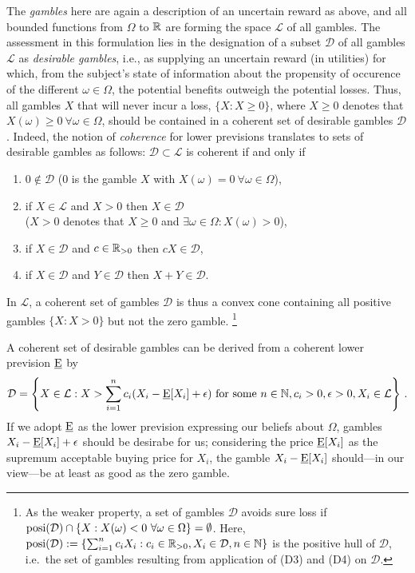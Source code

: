The \emph{gambles} here are again a description of an uncertain reward as above, 
and all bounded functions from $\Omega$ to $\mathbb{R}$
are forming the space $\mathcal{L}$ of all gambles.
The assessment in this formulation lies in the designation of a subset $\mathcal{D}$
of all gambles $\mathcal{L}$ as \emph{desirable gambles},
i.e., as supplying an uncertain reward (in utilities) for which,
from the subject's state of information
about the propensity of occurence of the different $\omega \in \Omega$,
the potential benefits outweigh the potential losses.
Thus, all gambles $X$ that will never incur a loss,
$\{X: X \ge 0\}$, where $X \ge 0$ denotes that $X(\omega) \ge 0\ \forall \omega \in \Omega$,
should be contained in a coherent set of desirable gambles $\mathcal{D}$.
Indeed, the notion of \emph{coherence} for lower previsions translates to sets of desirable gambles as follows:
$\mathcal{D} \subset \mathcal{L}$ is coherent if and only if
\parencite[p.~137]{2000:walley::towards}
\begin{enumerate}[(D1)]
\item $0 \notin \mathcal{D}$ ($0$ is the gamble $X$ with $X(\omega) = 0\ \forall \omega \in \Omega$),
\item if $X \in \mathcal{L}$ and $X > 0$ then $X \in \mathcal{D}$\\
($X > 0$ denotes that $X \ge 0$ and $\exists \omega \in \Omega: X(\omega) > 0$),
\item if $X \in \mathcal{D}$ and $c \in \mathbb{R}_{>0}$ then $cX \in \mathcal{D}$,
\item if $X \in \mathcal{D}$ and $Y \in \mathcal{D}$ then $X+Y \in \mathcal{D}$.
\end{enumerate}
In $\mathcal{L}$, a coherent set of gambles $\mathcal{D}$ is thus a convex cone
containing all positive gambles $\{X: X > 0\}$ but not the zero gamble.%
\footnote{As the weaker property, a set of gambles $\mathcal{D}$ avoids sure loss
if $\operatorname{posi}(\mathcal{D}) \cap \{X: X(\omega) < 0\ \forall \omega \in \Omega\} = \emptyset$.
Here, $\operatorname{posi}(\mathcal{D}) := \{ \sum_{i=1}^n c_i X_i : c_i \in \mathbb{R}_{>0}, X_i \in \mathcal{D}, n \in \mathbb{N} \}$
is the positive hull of $\mathcal{D}$, 
i.e.\ the set of gambles resulting from application of (D3) and (D4) on $\mathcal{D}$.}

A coherent set of desirable gambles can be derived from a coherent lower prevision $\underline{\operatorname{E}}$ by
\parencite[p.~139]{2000:walley::towards}
\begin{align*}
\mathcal{D} = \left\{ X \in \mathcal{L} :
X > \sum_{i=1}^n c_i (X_i - \underline{\operatorname{E}}[X_i] + \epsilon) \text{ for some } n \in \mathbb{N}, c_i > 0, \epsilon > 0, X_i \in \mathcal{L} \right\}\,.
\end{align*}
If we adopt $\underline{\operatorname{E}}$ as the lower prevision expressing our beliefs about $\Omega$,
gambles $X_i - \underline{\operatorname{E}}[X_i] + \epsilon$ should be desirabe for us;
considering the price $\underline{\operatorname{E}}[X_i]$ as the supremum acceptable buying price for $X_i$,
the gamble $X_i - \underline{\operatorname{E}}[X_i]$ should---in our view---be at least as good as the zero gamble.

